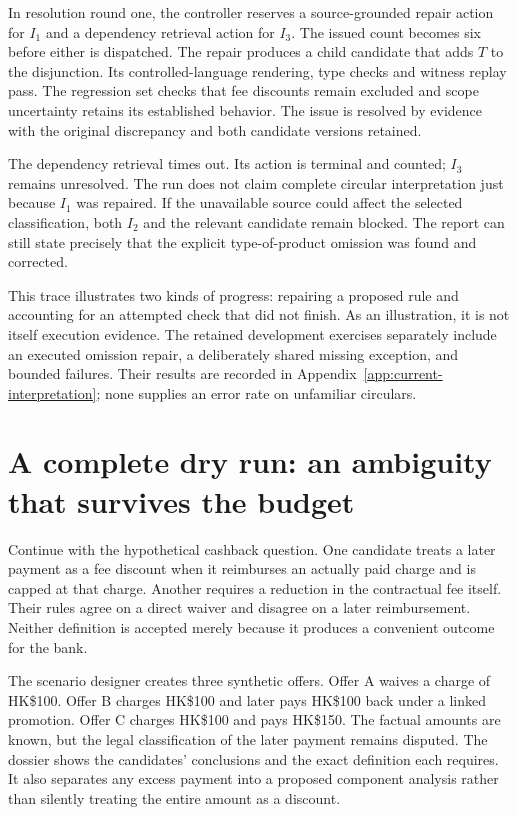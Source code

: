 
In resolution round one, the controller reserves a source-grounded repair action
for $I_1$ and a dependency retrieval action for $I_3$. The issued count becomes
six before either is dispatched. The repair produces a child candidate that adds
$T$ to the disjunction. Its controlled-language rendering, type checks and witness
replay pass. The regression set checks that fee discounts remain excluded and
scope uncertainty retains its established behavior. The issue is resolved by
evidence with the original discrepancy and both candidate versions retained.

The dependency retrieval times out. Its action is terminal and counted; $I_3$
remains unresolved. The run does not claim complete circular interpretation just
because $I_1$ was repaired. If the unavailable source could affect the selected
classification, both $I_2$ and the relevant candidate remain blocked. The report
can still state precisely that the explicit type-of-product omission was found
and corrected.

This trace illustrates two kinds of progress: repairing a proposed rule and
accounting for an attempted check that did not finish. As an illustration, it
is not itself execution evidence. The retained development exercises separately
include an executed omission repair, a deliberately shared missing exception,
and bounded failures. Their results are recorded in
Appendix~\ref{app:current-interpretation}; none supplies an error rate on
unfamiliar circulars.

\section{A complete dry run: an ambiguity that survives the budget}
\label{merge:M06:21}


Continue with the hypothetical cashback question. One candidate treats a later
payment as a fee discount when it reimburses an actually paid charge and is capped
at that charge. Another requires a reduction in the contractual fee itself.
Their rules agree on a direct waiver and disagree on a later reimbursement.
Neither definition is accepted merely because it produces a convenient outcome
for the bank.

The scenario designer creates three synthetic offers. Offer A waives a charge of
HK\$100. Offer B charges HK\$100 and later pays HK\$100 back under a linked
promotion. Offer C charges HK\$100 and pays HK\$150. The factual amounts are known,
but the legal classification of the later payment remains disputed. The dossier
shows the candidates' conclusions and the exact definition each requires. It
also separates any excess payment into a proposed component analysis rather than
silently treating the entire amount as a discount.

